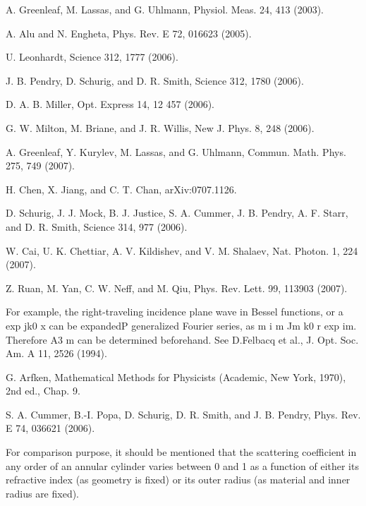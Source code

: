 \documentclass[12pt]{article}
\begin{document}
\begin{thebibliography}{99}
 A. Greenleaf, M. Lassas, and G. Uhlmann,
  Physiol. Meas. 24, 413 (2003).

 A. Alu and N. Engheta, Phys. Rev. E 72, 016623 (2005).

 U. Leonhardt, Science 312, 1777 (2006).

 J. B. Pendry, D. Schurig, and D. R. Smith, Science 312,
  1780 (2006).

 D. A. B. Miller, Opt. Express 14, 12 457 (2006).

 G. W. Milton, M. Briane, and J. R. Willis, New J. Phys. 8,
  248 (2006).

 A. Greenleaf, Y. Kurylev, M. Lassas, and G. Uhlmann,
  Commun. Math. Phys. 275, 749 (2007).

 H. Chen, X. Jiang, and C. T. Chan, arXiv:0707.1126.

 D. Schurig, J. J. Mock, B. J. Justice, S. A. Cummer,
  J. B. Pendry, A. F. Starr, and D. R. Smith, Science 314, 977 (2006).

 W. Cai, U. K. Chettiar, A. V. Kildishev, and
  V. M. Shalaev, Nat. Photon. 1, 224 (2007).

 Z. Ruan, M. Yan, C. W. Neff, and M. Qiu,
  Phys. Rev. Lett. 99, 113903 (2007).

 For example, the right-traveling incidence plane wave in
  Bessel functions, or a exp jk0 x can be expandedP generalized
  Fourier series, as m i m Jm k0 r exp im. Therefore A3 m can be
  determined beforehand. See D.Felbacq et al., J. Opt. Soc. Am. A 11,
  2526 (1994).

 G. Arfken, Mathematical Methods for Physicists (Academic,
  New York, 1970), 2nd ed., Chap. 9.

 S. A. Cummer, B.-I. Popa, D. Schurig, D. R. Smith, and
  J. B. Pendry, Phys. Rev. E 74, 036621 (2006).

 For comparison purpose, it should be mentioned that the
  scattering coefficient in any order of an annular cylinder
  varies between 0 and 1 as a function of either its refractive
  index (as geometry is fixed) or its outer radius (as material
  and inner radius are fixed).
\end{thebibliography}
\end{document}
